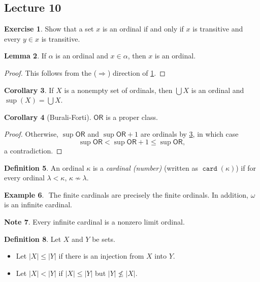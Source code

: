 \documentclass[10pt,letterpaper,cm]{nupset}
\theoremstyle{definition}
\newtheorem{definition}{Definition}[subsection]
\newtheorem{exmp}[definition]{Example}
\newtheorem{note}[definition]{Note}
\theoremstyle{theorem}
\newtheorem{lemma}[definition]{Lemma}
\newtheorem{corollary}[definition]{Corollary}
\newtheorem{exercise}[definition]{Exercise}
\theoremstyle{remark}
\newcommand{\1}{\mathbf{1}}
\newcommand{\0}{\vec 0}
\newcommand{\ord}{\mathsf{OR}}
\DeclareMathOperator{\card}{\mathtt{card}}
\begin{document}
\subsection{Lecture 10}


\begin{exercise}\label{ord-char}
Show that a set $x$ is an ordinal if and only if $x$ is transitive and every $y\in x$ is transitive. 
\end{exercise}

\begin{lemma}
If $\alpha$ is an ordinal and $x\in \alpha$, then $x$ is an ordinal. 
\end{lemma}
\begin{proof}
This follows from the ($\Longrightarrow$) direction of \cref{ord-char}.
\end{proof}

\begin{corollary}\label{LC}
If $X$ is a nonempty set of ordinals, then $\bigcup{X}$ is an ordinal and $\sup(X) = \bigcup{X}$.
\end{corollary}

\begin{corollary}[Burali-Forti]\label{B-F}
$\ord$ is a proper class.
\end{corollary}
\begin{proof}
Otherwise, $\sup{\ord}$ and $\sup{\ord}+1$ are ordinals by \cref{LC}, in which case $$\sup{\ord} < \sup{\ord} +1 \leq \sup{\ord},$$ a contradiction. 
 \end{proof}

\begin{definition}
 An ordinal $\kappa$ is a \textit{cardinal (number)} (written as $\card(\kappa)$) if for every ordinal $\lambda < \kappa$, $\kappa \not \sim \lambda$.
\end{definition}

\begin{exmp} $ $
The finite cardinals are precisely the finite ordinals. In addition, $\omega$ is an infinite cardinal.
\end{exmp}

\begin{note}
Every infinite cardinal is a nonzero limit ordinal. 
\end{note}

\begin{definition}
Let $X$ and $Y$ be sets. 
\begin{itemize}
\item Let $\lvert{X}\rvert \leq \lvert{Y}\rvert$ if there is an injection from $X$ into $Y$. 
\item Let $\lvert{X}\rvert<\lvert{Y}\rvert$ if $\lvert{X}\rvert \leq \lvert{Y}\rvert$ but $\lvert{Y}\rvert \not \leq \lvert{X}\rvert$.
\end{itemize}
\end{definition}
\end{document}

